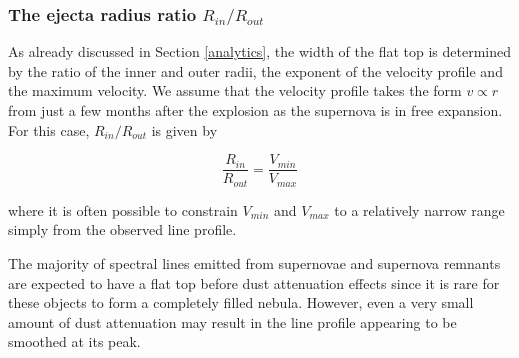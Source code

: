 \documentclass[useAMS,usenatbib,usegraphicx]{mnras}
\begin{document}
\subsubsection{The ejecta radius ratio $R_{in}/R_{out}$}

As already discussed in Section \ref{analytics}, the width of the flat top 
is determined by the ratio of the inner and outer radii, the 
exponent of the velocity profile and the maximum velocity.  We 
assume that the velocity profile takes the form $v \propto r$ from 
just a few months after the explosion as the supernova is in free 
expansion.  For this case, $R_{in}/R_{out}$ is given by

\begin{equation}
\frac{R_{in}}{R_{out}}=\frac{V_{min}}{V_{max}}
\end{equation}

\noindent where it is often possible to constrain $V_{min}$ and $V_{max}$ 
to a relatively narrow range simply from the observed line profile.

The majority of spectral lines emitted from supernovae and supernova 
remnants are expected to have a flat top before dust attenuation effects since it is rare for these 
objects to form a completely filled nebula.  However, even a very small amount of 
dust attenuation may result in the line profile appearing to be smoothed at its 
peak.
\end{document}
